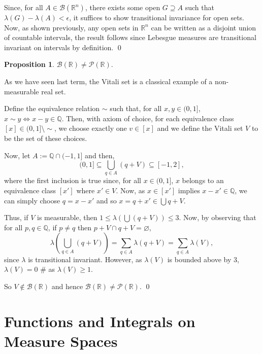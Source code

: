 \documentclass[
]{article}
\theoremstyle{definition}
\newtheorem{prop}{Proposition}
\theoremstyle{definition}
\begin{document}
Since, for all \(A \in \mathcal{B}(\mathbb{R}^n)\), there exists some
open \(G \supseteq A\) such that \(\lambda(G) - \lambda(A) < \epsilon\),
it suffices to show transitional invariance for open sets. Now, as shown
previously, any open sets in \(\mathbb{R}^n\) can be written as a
disjoint union of countable intervals, the result follows since Lebesgue
measures are transitional invariant on intervals by definition. \qed

\begin{prop}
  \(\mathcal{B}(\mathbb{R}) \neq \mathcal{P}(\mathbb{R})\).
\end{prop}
\proof

As we have seen last term, the Vitali set is a classical example of a
non-measurable real set.

Define the equivalence relation \(\sim\) such that, for all
\(x, y \in (0, 1]\), \(x \sim y \iff x - y \in \mathbb{Q}\). Then, with
axiom of choice, for each equivalence class
\([x] \in (0, 1] \setminus \sim\), we choose exactly one \(v \in [x]\)
and we define the Vitali set \(V\) to be the set of these choices.

Now, let \(A := \mathbb{Q} \cap (-1, 1]\) and then,
\[(0, 1] \subseteq \bigcup_{q \in A} (q + V) \subseteq [-1, 2],\] where
the first inclusion is true since, for all \(x \in (0, 1]\), \(x\)
belongs to an equivalence class \([x']\) where \(x' \in V\). Now, as
\(x \in [x']\) implies \(x - x' \in \mathbb{Q}\), we can simply choose
\(q = x - x'\) and so \(x = q + x' \in \bigcup q + V\).

Thus, if \(V\) is measurable, then
\(1 \le \lambda(\bigcup(q + V)) \le 3\). Now, by observing that for all
\(p, q \in \mathbb{Q}\), if \(p \neq q\) then
\(p + V \cap q + V = \varnothing\),
\[\lambda\left(\bigcup_{q \in A}(q + V)\right) = \sum_{q \in A} \lambda(q + V)
    = \sum_{q \in A} \lambda(V),\] since \(\lambda\) is transitional
invariant. However, as \(\lambda(V)\) is bounded above by 3,
\(\lambda(V) = 0\) \# as \(\lambda(V) \ge 1\).

So \(V \not\in \mathcal{B}(\mathbb{R})\) and hence
\(\mathcal{B}(\mathbb{R}) \neq \mathcal{P}(\mathbb{R})\). \qed

\newpage

\hypertarget{functions-and-integrals-on-measure-spaces}{%
\section{Functions and Integrals on Measure
Spaces}\label{functions-and-integrals-on-measure-spaces}}
\end{document}
